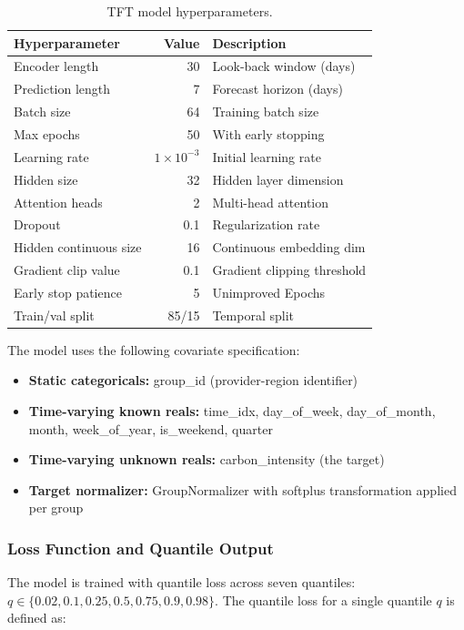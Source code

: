 \documentclass[conference]{IEEEtran}
\begin{document}
\begin{table}[htbp]
\centering
\caption{TFT model hyperparameters.}
\label{tab:hyperparams}
\small
\begin{tabular}{lrl}
\toprule
\textbf{Hyperparameter} & \textbf{Value} & \textbf{Description} \\
\midrule
Encoder length & 30 & Look-back window (days) \\
Prediction length & 7 & Forecast horizon (days) \\
Batch size & 64 & Training batch size \\
Max epochs & 50 & With early stopping \\
Learning rate & $1 \times 10^{-3}$ & Initial learning rate \\
Hidden size & 32 & Hidden layer dimension \\
Attention heads & 2 & Multi-head attention \\
Dropout & 0.1 & Regularization rate \\
Hidden continuous size & 16 & Continuous embedding dim \\
Gradient clip value & 0.1 & Gradient clipping threshold \\
Early stop patience & 5 & Unimproved Epochs \\
Train/val split & 85/15 & Temporal split \\
\bottomrule
\end{tabular}
\end{table}

The model uses the following covariate specification:
\begin{itemize}
    \item \textbf{Static categoricals:} group\_id (provider-region identifier)
    \item \textbf{Time-varying known reals:} time\_idx, day\_of\_week, day\_of\_month, month, week\_of\_year, is\_weekend, quarter
    \item \textbf{Time-varying unknown reals:} carbon\_intensity (the target)
    \item \textbf{Target normalizer:} GroupNormalizer with softplus transformation applied per group
\end{itemize}

\subsubsection{Loss Function and Quantile Output}

The model is trained with quantile loss across seven quantiles: $q \in \{0.02, 0.1, 0.25, 0.5, 0.75, 0.9, 0.98\}$. The quantile loss for a single quantile $q$ is defined as:
\end{document}
